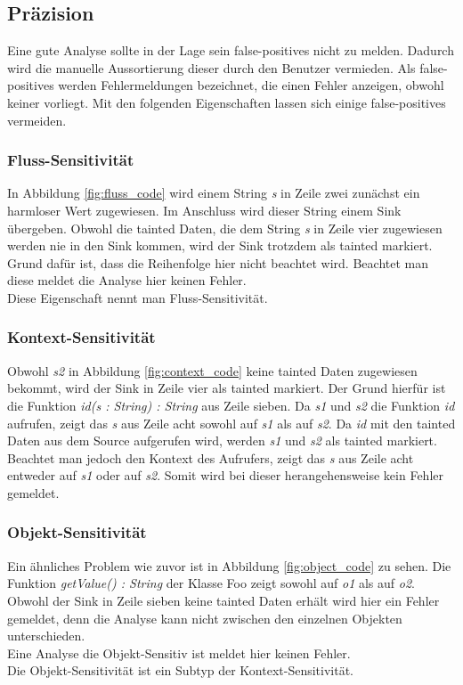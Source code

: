 \documentclass[runningheads]{llncs}
\begin{document}
\subsection{Präzision}
Eine gute Analyse sollte in der Lage sein false-positives nicht zu melden. Dadurch wird die manuelle Aussortierung dieser durch den Benutzer vermieden. Als false-positives werden Fehlermeldungen bezeichnet, die einen Fehler anzeigen, obwohl keiner vorliegt. Mit den folgenden Eigenschaften lassen sich einige false-positives vermeiden.

\subsubsection{Fluss-Sensitivität}
In Abbildung \ref{fig:fluss_code} wird einem String \emph{s} in Zeile zwei zunächst ein harmloser Wert zugewiesen. Im Anschluss wird dieser String einem Sink übergeben. Obwohl die tainted Daten, die dem String \emph{s} in Zeile vier zugewiesen werden nie in den Sink kommen, wird der Sink trotzdem als tainted markiert. Grund dafür ist, dass die Reihenfolge hier nicht beachtet wird. Beachtet man diese meldet die Analyse hier keinen Fehler. 
\\Diese Eigenschaft nennt man Fluss-Sensitivität.

\subsubsection{Kontext-Sensitivität}
Obwohl \emph{s2} in Abbildung \ref{fig:context_code} keine tainted Daten zugewiesen bekommt, wird der Sink in Zeile vier als tainted markiert. Der Grund hierfür ist die Funktion \emph{id(s : String) : String} aus Zeile sieben. Da \emph{s1} und \emph{s2} die Funktion \emph{id} aufrufen, zeigt das \emph{s} aus Zeile acht sowohl auf \emph{s1} als auf \emph{s2}. Da \emph{id} mit den tainted Daten aus dem Source aufgerufen wird, werden \emph{s1} und \emph{s2} als tainted markiert. 
\\Beachtet man jedoch den Kontext des Aufrufers, zeigt das \emph{s} aus Zeile acht entweder auf \emph{s1} oder auf \emph{s2}. Somit wird bei dieser herangehensweise kein Fehler gemeldet.

\subsubsection{Objekt-Sensitivität}
Ein ähnliches Problem wie zuvor ist in Abbildung \ref{fig:object_code} zu sehen. Die Funktion \emph{getValue() : String} der Klasse Foo zeigt sowohl auf \emph{o1} als auf \emph{o2}. Obwohl der Sink in Zeile sieben keine tainted Daten erhält wird hier ein Fehler gemeldet, denn die Analyse kann nicht zwischen den einzelnen Objekten unterschieden. 
\\Eine Analyse die Objekt-Sensitiv ist meldet hier keinen Fehler. 
\\Die Objekt-Sensitivität ist ein Subtyp der Kontext-Sensitivität.
\end{document}
